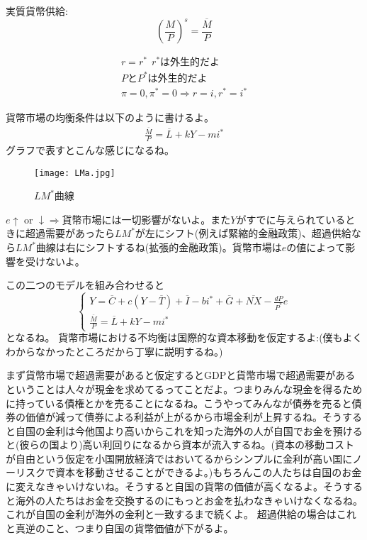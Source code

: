 \documentclass[a4paper, 12pt]{article}
\begin{document}
実質貨幣供給:
\begin{equation*}
  \left(\frac{M}{P}\right)^s=\frac{\overline{M}}{P}
\end{equation*}

\begin{displaymath}
  \begin{array}{l}
    \displaystyle r = r^* \ \  r^* \text{は外生的だよ}\\
    \displaystyle P \text{と} P^* \text{は外生的だよ}\\
    \displaystyle \pi = 0, \pi^* = 0 \Rightarrow r=i, r^*=i^*
  \end{array}
\end{displaymath}

貨幣市場の均衡条件は以下のように書けるよ。
\begin{displaymath}
  \begin{array}{l}
    \displaystyle \frac{\overline{M}}{P}=\overline{L}+kY-mi^*
  \end{array}
\end{displaymath}
グラフで表すとこんな感じになるね。
\begin{figure}[h]
\begin{center}
\texttt{[image: LMa.jpg]}
\caption{$LM^*$曲線}
\label{}
\end{center}
\end{figure}

$e \uparrow$ or $\downarrow \Rightarrow$貨幣市場には一切影響がないよ。また$Y$がすでに与えられているときに超過需要があったら$LM^*$が左にシフト(例えば緊縮的金融政策)、超過供給なら$LM^*$曲線は右にシフトするね(拡張的金融政策)。貨幣市場は$e$の値によって影響を受けないよ。

この二つのモデルを組み合わせると
\begin{displaymath}
  \left\{\begin{array}{l}
    \displaystyle Y = \overline{C}+c(Y-\overline{T})+\overline{I}-bi^*+\overline{G}+\overline{NX}-\frac{dP}{P^*}e\\
    \displaystyle \frac{\overline{M}}{P}=\overline{L}+kY-mi^*
  \end{array}\right.
\end{displaymath}
となるね。
貨幣市場における不均衡は国際的な資本移動を仮定するよ:(僕もよくわからなかったところだから丁寧に説明するね。)

まず貨幣市場で超過需要があると仮定するとGDPと貨幣市場で超過需要があるということは人々が現金を求めてるってことだよ。つまりみんな現金を得るために持っている債権とかを売ることになるね。こうやってみんなが債券を売ると債券の価値が減って債券による利益が上がるから市場金利が上昇するね。そうすると自国の金利は今他国より高いからこれを知った海外の人が自国でお金を預けると(彼らの国より)高い利回りになるから資本が流入するね。(資本の移動コストが自由という仮定を小国開放経済ではおいてるからシンプルに金利が高い国にノーリスクで資本を移動させることができるよ。)もちろんこの人たちは自国のお金に変えなきゃいけないね。そうすると自国の貨幣の価値が高くなるよ。そうすると海外の人たちはお金を交換するのにもっとお金を払わなきゃいけなくなるね。これが自国の金利が海外の金利と一致するまで続くよ。
超過供給の場合はこれと真逆のこと、つまり自国の貨幣価値が下がるよ。
\end{document}
